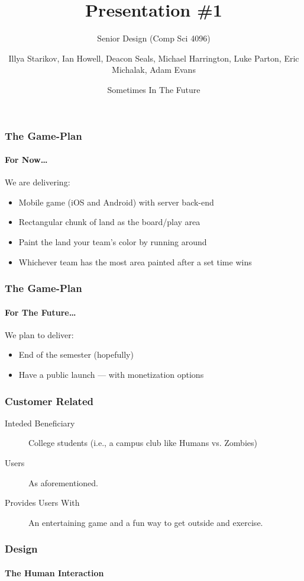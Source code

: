 \documentclass[xcolor=dvipsnames]{beamer}
\title{Presentation \#1}
\subtitle{Senior Design (Comp Sci 4096)}
\author{Illya Starikov, Ian Howell, Deacon Seals, Michael Harrington, Luke Parton, Eric Michalak, Adam Evans}
\date{Sometimes In The Future}
\institute{Missouri University of Science and Technology}
\begin{document}
\begin{darkframes}
    \maketitle


    \begin{frame}
        \frametitle{The Game-Plan}
        \framesubtitle{For Now\ldots}
        We are delivering:

        \begin{itemize}
            \item Mobile game (iOS and Android) with server back-end
            \item Rectangular chunk of land as the board/play area
            \item Paint the land your team's color by running around
            \item Whichever team has the most area painted after a set time wins
        \end{itemize}
    \end{frame}


    \begin{frame}
        \frametitle{The Game-Plan}
        \framesubtitle{For The Future\ldots}

        We plan to deliver:

        \begin{itemize}
            \item End of the semester (hopefully)
            \item Have a public launch --- with monetization options
        \end{itemize}
    \end{frame}


    \begin{frame}
        \frametitle{Customer Related}

        \begin{description}
            \item[Inteded Beneficiary] College students (i.e., a campus club like Humans vs. Zombies)
            \item[\phantom{Placeholder---} Users]           As aforementioned.
            \item[Provides Users With] An entertaining game and a fun way to get outside and exercise.
        \end{description}
    \end{frame}


    \begin{frame}
        \frametitle{Design}
        \framesubtitle{The Human Interaction}


\end{frame}
\end{darkframes}
\end{document}
